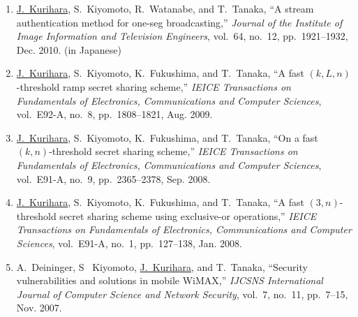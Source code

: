 \begin{enumerate}
 \item \underline{J.~Kurihara}, S.~Kiyomoto, R.~Watanabe, and
       T.~Tanaka, ``A stream authentication method for one-seg
       broadcasting,'' \textit{Journal of the Institute of Image
       Information and Television Engineers},
       vol.~64, no.~12, pp.~1921--1932, Dec. 2010. (in Japanese)
 \item \underline{J.~Kurihara}, S.~Kiyomoto, K.~Fukushima, and
       T.~Tanaka, ``A fast $(k,L,n)$-threshold ramp secret sharing
       scheme,'' \textit{IEICE Transactions on Fundamentals of Electronics, Communications and Computer Sciences},
       vol.~E92-A, no.~8, pp.~1808--1821, Aug. 2009.
 \item \underline{J.~Kurihara}, S.~Kiyomoto, K.~Fukushima, and
       T.~Tanaka, ``On a fast $(k,n)$-threshold secret sharing scheme,''
       \textit{IEICE Transactions on Fundamentals of Electronics, Communications and Computer Sciences},
       vol.~E91-A, no.~9, pp.~2365--2378, Sep. 2008.
 \item \underline{J.~Kurihara}, S.~Kiyomoto, K.~Fukushima, and
       T.~Tanaka, ``A fast $(3,n)$-threshold secret sharing scheme using
       exclusive-or operations,''
       \textit{IEICE Transactions on Fundamentals of Electronics, Communications and Computer Sciences},
       vol.~E91-A, no.~1, pp.~127--138, Jan. 2008.
 \item A.~Deininger, S~ Kiyomoto, \underline{J.~Kurihara}, and
       T.~Tanaka, ``Security vulnerabilities and solutions in mobile
       WiMAX,'' \textit{IJCSNS International Journal of Computer Science
       and Network Security}, vol.~7, no.~11, pp.~7--15, Nov. 2007.
\end{enumerate}


